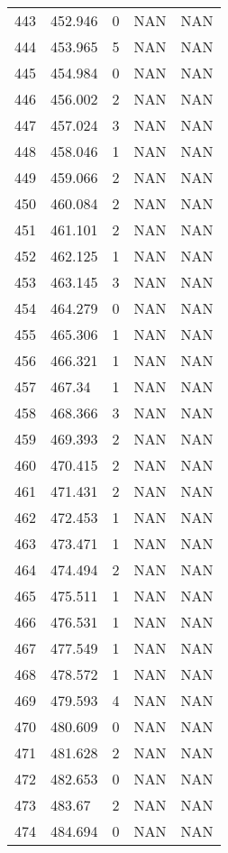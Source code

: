 \documentclass{article}
\begin{document}
\begin{longtable}{@{}lllll@{}}
				443 & 452.946 & 0    & NAN  & NAN  \\
				444 & 453.965 & 5    & NAN  & NAN  \\
				445 & 454.984 & 0    & NAN  & NAN  \\
				446 & 456.002 & 2    & NAN  & NAN  \\
				447 & 457.024 & 3    & NAN  & NAN  \\
				448 & 458.046 & 1    & NAN  & NAN  \\
				449 & 459.066 & 2    & NAN  & NAN  \\
				450 & 460.084 & 2    & NAN  & NAN  \\
				451 & 461.101 & 2    & NAN  & NAN  \\
				452 & 462.125 & 1    & NAN  & NAN  \\
				453 & 463.145 & 3    & NAN  & NAN  \\
				454 & 464.279 & 0    & NAN  & NAN  \\
				455 & 465.306 & 1    & NAN  & NAN  \\
				456 & 466.321 & 1    & NAN  & NAN  \\
				457 & 467.34  & 1    & NAN  & NAN  \\
				458 & 468.366 & 3    & NAN  & NAN  \\
				459 & 469.393 & 2    & NAN  & NAN  \\
				460 & 470.415 & 2    & NAN  & NAN  \\
				461 & 471.431 & 2    & NAN  & NAN  \\
				462 & 472.453 & 1    & NAN  & NAN  \\
				463 & 473.471 & 1    & NAN  & NAN  \\
				464 & 474.494 & 2    & NAN  & NAN  \\
				465 & 475.511 & 1    & NAN  & NAN  \\
				466 & 476.531 & 1    & NAN  & NAN  \\
				467 & 477.549 & 1    & NAN  & NAN  \\
				468 & 478.572 & 1    & NAN  & NAN  \\
				469 & 479.593 & 4    & NAN  & NAN  \\
				470 & 480.609 & 0    & NAN  & NAN  \\
				471 & 481.628 & 2    & NAN  & NAN  \\
				472 & 482.653 & 0    & NAN  & NAN  \\
				473 & 483.67  & 2    & NAN  & NAN  \\
				474 & 484.694 & 0    & NAN  & NAN  \\

\end{longtable}
\end{document}
